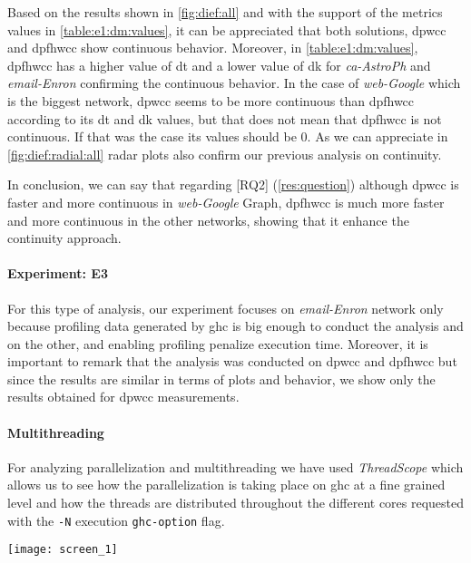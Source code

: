 Based on the results shown in \autoref{fig:dief:all} and with the support of the metrics values in \autoref{table:e1:dm:values}, it can be appreciated that both solutions, \acrshort{dpwcc} and \acrshort{dpfhwcc} show continuous behavior.
Moreover, in \autoref{table:e1:dm:values}, \acrshort{dpfhwcc} has a higher value of \acrshort{dt} and a lower value of \acrshort{dk} for \textit{ca-AstroPh} and \textit{email-Enron} confirming the continuous behavior. In the case of \textit{web-Google} which is the biggest network, \acrshort{dpwcc} seems to be more continuous than \acrshort{dpfhwcc} according to its \acrshort{dt} and \acrshort{dk} values, but that does not mean that \acrshort{dpfhwcc} is not continuous. If that was the case its values should be $0$.
As we can appreciate in \autoref{fig:dief:radial:all} radar plots also confirm our previous analysis on continuity.

In conclusion, we can say that regarding [RQ2] (\autoref{res:question}) although \acrshort{dpwcc} is faster and more continuous in \emph{web-Google} Graph, \acrshort{dpfhwcc} is much more faster and more continuous in the other networks, showing that it enhance the continuity approach.

\paragraph{Experiment: E3}
For this type of analysis, our experiment focuses on \emph{email-Enron} network \cite{netenron} only because profiling data generated by \acrshort{ghc} is big enough to conduct the analysis and on the other, and enabling profiling penalize execution time.
Moreover, it is important to remark that the analysis was conducted on \acrshort{dpwcc} and \acrshort{dpfhwcc} but since the results are similar in terms of plots and behavior, we show only the results obtained for \acrshort{dpwcc} measurements.

\paragraph{Multithreading} For analyzing parallelization and multithreading we have used \textit{ThreadScope} \cite{threadscope} which allows us to see how the parallelization is taking place on \acrshort{ghc} at a fine grained level and how the threads are distributed throughout the different cores requested with the \texttt{-N} execution \texttt{ghc-option} flag.

\begin{minipage}[t!]{\linewidth}

  \texttt{[image: screen\_1]}
  \captionsetup{type=figure}
  \label{fig:3}
\end{minipage}

